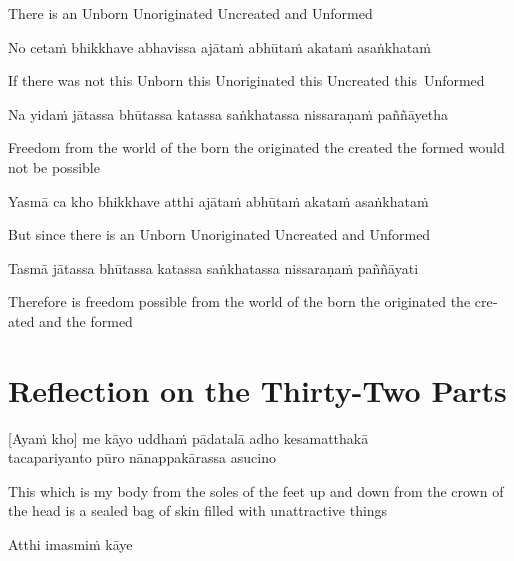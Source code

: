 \begin{english}
  There is an Unborn Unoriginated Uncreated and Unformed
\end{english}

No cetaṁ bhikkhave abhavissa ajātaṁ abhūtaṁ akataṁ asaṅkhataṁ

\begin{english}
  If there was not this Unborn this Unoriginated this Uncreated this~Unformed
\end{english}

Na yidaṁ jātassa bhūtassa katassa saṅkhatassa nissaraṇaṁ paññāyetha

\begin{english}
  Freedom from the world of the born the originated the created the formed would not be possible
\end{english}

Yasmā ca kho bhikkhave atthi ajātaṁ abhūtaṁ akataṁ asaṅkhataṁ

\begin{english}
  But since there is an Unborn Unoriginated Uncreated and Unformed
\end{english}

Tasmā jātassa bhūtassa katassa saṅkhatassa nissaraṇaṁ paññāyati

\begin{english}
  Therefore is freedom possible from the world of the born the originated the created and the formed 
\end{english}

\section{Reflection on the Thirty-Two Parts}

\begin{leader}
\end{leader}


[Ayaṁ kho] me kāyo uddhaṁ pādatalā adho kesamatthakā\\
tacapariyanto pūro nānappakārassa asucino

\begin{english}
  This which is my body from the soles of the feet up and down from the crown of the head is a sealed bag of skin filled with unattractive things
\end{english}

Atthi imasmiṁ kāye

